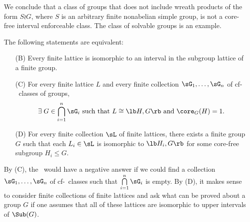 \begin{frame}[label=IEPropsLemma2]{}
We conclude that a class of groups that does
not include wreath products of the form $S\wr G$, where $S$ is an arbitrary
finite nonabelian simple group, is not a core-free interval enforceable class. 
The class of solvable groups is an example.
\end{frame}




\begin{frame}[fragile,label=Parachutes]{}
\begin{theorem}
The following statements are equivalent:
\begin{enumerate}
\item[(B)] Every finite lattice is isomorphic to
  an interval in the subgroup lattice of a finite group.
\item[(C)]
For every finite lattice $L$ and every finite collection $\sG_1, \dots, \sG_n$
of cf-\IE\ classes of groups,
\[
\exists \; G \in \bigcap\limits_{i=1}^n \sG_i \text{ such that $L \cong \lb H,G \rb$
  and $\core_G(H)=1$}.
\]
\item[(D)]
For every finite collection $\sL$ of finite lattices, there exists a finite
group $G$ such that each $L_i \in \sL$ is isomorphic to $\lb H_i, G \rb$ for some
core-free subgroup $H_i\leq G$.
\end{enumerate}
\end{theorem}
\end{frame}

\begin{frame}[fragile,label=Parachutes]{}
By (C), the \FLRP\ would have a negative answer if we
could find a collection $\sG_1, \dots, \sG_n$ of cf-\IE\ classes
such that $\bigcap\limits_{i=1}^n \sG_i$ is empty.
\vskip6mm
By (D), it makes sense to consider finite collections of finite lattices and ask
what can be proved about a group $G$ if one assumes that all of these lattices are
isomorphic to upper intervals of $\Sub(G)$. 
\end{frame}


